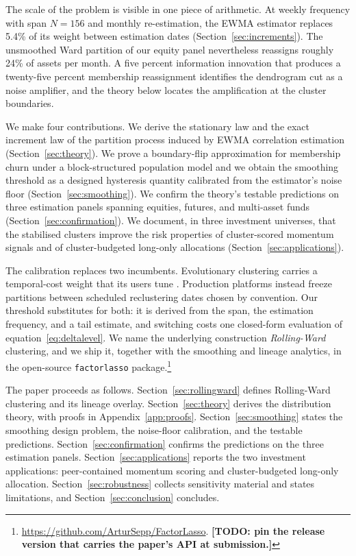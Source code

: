\documentclass{rQUF2e}
\theoremstyle{plain}
\theoremstyle{remark}
\newcommand{\TODO}[1]{\textbf{[TODO: #1]}}
\begin{document}
The scale of the problem is visible in one piece of arithmetic. At weekly
frequency with span $N=156$ and monthly re-estimation, the EWMA estimator
replaces 5.4\% of its weight between estimation dates
(Section~\ref{sec:increments}). The unsmoothed Ward partition of our equity
panel nevertheless reassigns roughly 24\% of assets per month. A five percent
information innovation that produces a twenty-five percent membership
reassignment identifies the dendrogram cut as a noise amplifier, and the theory
below locates the amplification at the cluster boundaries.

We make four contributions. We derive the stationary law and the exact
increment law of the partition process induced by EWMA correlation estimation
(Section~\ref{sec:theory}). We prove a boundary-flip approximation for
membership churn under a block-structured population model and we obtain the
smoothing threshold as a designed hysteresis quantity calibrated from the
estimator's noise floor (Section~\ref{sec:smoothing}). We confirm the theory's
testable predictions on three estimation panels spanning equities, futures, and
multi-asset funds (Section~\ref{sec:confirmation}). We document, in three
investment universes, that the stabilised clusters improve the risk properties
of cluster-scored momentum signals and of cluster-budgeted long-only
allocations (Section~\ref{sec:applications}).

The calibration replaces two incumbents. Evolutionary clustering carries a
temporal-cost weight that its users tune \citep{chakrabarti2006evolutionary,
xu2014adaptive}. Production platforms instead freeze partitions between
scheduled reclustering dates chosen by convention. Our threshold substitutes
for both: it is derived from the span, the estimation frequency, and a tail
estimate, and switching costs one closed-form evaluation of
equation~\eqref{eq:deltalevel}. We name the underlying construction
\emph{Rolling-Ward} clustering, and we ship it, together with the smoothing
and lineage analytics, in the open-source \texttt{factorlasso}
package.\footnote{\url{https://github.com/ArturSepp/FactorLasso}.
\TODO{pin the release version that carries the paper's API at submission.}}

The paper proceeds as follows. Section~\ref{sec:rollingward} defines
Rolling-Ward clustering and its lineage overlay. Section~\ref{sec:theory}
derives the distribution theory, with proofs in
Appendix~\ref{app:proofs}. Section~\ref{sec:smoothing} states the smoothing
design problem, the noise-floor calibration, and the testable predictions.
Section~\ref{sec:confirmation} confirms the predictions on the three
estimation panels. Section~\ref{sec:applications} reports the two investment
applications: peer-contained momentum scoring and cluster-budgeted long-only
allocation. Section~\ref{sec:robustness} collects sensitivity material and
states limitations, and Section~\ref{sec:conclusion} concludes.
\end{document}
